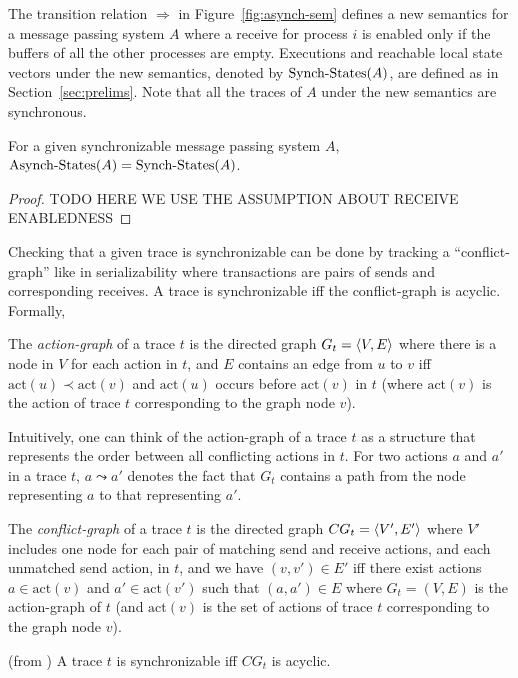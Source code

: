 The transition relation $\Rightarrow$ in Figure~\ref{fig:asynch-sem} defines a new semantics for  a message passing system $A$
where a receive for process $i$ is enabled only if the buffers of all the other processes are empty. Executions and reachable local
state vectors under the new semantics, denoted by $\mathrm{Synch}\text{-}\mathrm{States}(A)$, are defined as in Section~\ref{sec:prelims}.
Note that all the traces of $A$ under the new semantics are synchronous.

\begin{lemma}
For a given synchronizable message passing system $A$, $\mathrm{Asynch}\text{-}\mathrm{States}(A)=\mathrm{Synch}\text{-}\mathrm{States}(A)$.
\end{lemma}
\begin{proof}
TODO HERE WE USE THE ASSUMPTION ABOUT RECEIVE ENABLEDNESS
\end{proof}

Checking that a given trace is synchronizable can be done by tracking a ``conflict-graph'' like in serializability 
where transactions are pairs of sends and corresponding receives. 
A trace is synchronizable if{f} the conflict-graph is acyclic. Formally,

\begin{definition}\label{def:pr_graphs}
    The \emph{action-graph} of a trace $t$ is the directed graph 
    $G_t = \left\langle {V,E} \right\rangle$ where there is a node in $V$ for each action in $t$, and $E$ 
    contains an edge from $u$ to $v$ iff $\mathrm{act}(u) \prec \mathrm{act}(v)$ and $\mathrm{act}(u)$ occurs before $\mathrm{act}(v)$ in $t$ (where $\mathrm{act}(v)$ is the action of trace $t$ corresponding to the graph node $v$).
\end{definition}
Intuitively, one can think of the action-graph of a trace $t$ as a structure that represents the order between all conflicting actions in $t$.
For two actions $a$ and $a'$ in a trace $t$, $a\leadsto a'$ denotes the fact that $G_t$ contains a path from the node representing $a$ to that representing $a'$.

\begin{definition}\label{def:conf_graph}
    The \emph{conflict-graph} of a trace $t$ is the directed graph $CG_t=\left\langle {V',E'} \right\rangle$ where $V'$ includes one node for each pair of matching send and receive actions, and each unmatched send action, in $t$, and we have $(v,v') \in E'$ iff there exist actions $a \in \mathrm{act}(v)$ and $a' \in \mathrm{act}(v')$ such that $(a,a') \in E$ where $G_t = (V,E)$ is the action-graph of $t$ (and $\mathrm{act}(v)$ is the set of actions of trace $t$ corresponding to the graph node $v$).
\end{definition}



\begin{theorem}\label{thm:cg} (from \citep{journals/jacm/Papadimitriou79b})
A trace $t$ is synchronizable if{f} $CG_t$ is acyclic.
\end{theorem}



